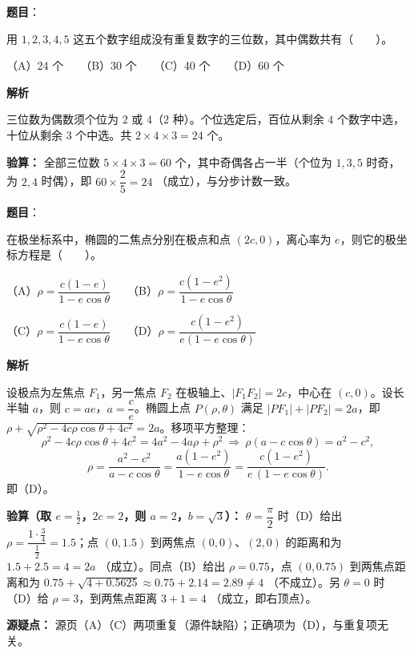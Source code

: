 \begin{answer}

\textbf{题目}：

用 $1,2,3,4,5$ 这五个数字组成没有重复数字的三位数，其中偶数共有\mbox{（　　）}。

（A）24 个　　（B）30 个　　（C）40 个　　（D）60 个

\textbf{解析}

三位数为偶数须个位为 $2$ 或 $4$（$2$ 种）。个位选定后，百位从剩余 $4$ 个数字中选，十位从剩余 $3$ 个中选。共 $2\times4\times3=24$ 个。

\textbf{验算：} 全部三位数 $5\times4\times3=60$ 个，其中奇偶各占一半（个位为 $1,3,5$ 时奇，为 $2,4$ 时偶），即 $60\times\dfrac25=24$ （成立），与分步计数一致。


\par\medskip

\end{answer}
\begin{answer}

\textbf{题目}：

在极坐标系中，椭圆的二焦点分别在极点和点 $(2c,0)$，离心率为 $e$，则它的极坐标方程是\mbox{（　　）}。

（A）$\rho=\dfrac{c(1-e)}{1-e\cos\theta}$　　（B）$\rho=\dfrac{c(1-e^2)}{1-e\cos\theta}$

（C）$\rho=\dfrac{c(1-e)}{1-e\cos\theta}$　　（D）$\rho=\dfrac{c(1-e^2)}{e(1-e\cos\theta)}$

\textbf{解析}

设极点为左焦点 $F_1$，另一焦点 $F_2$ 在极轴上、$|F_1F_2|=2c$，中心在 $(c,0)$。设长半轴 $a$，则 $c=ae$，$a=\dfrac{c}{e}$。椭圆上点 $P(\rho,\theta)$ 满足 $|PF_1|+|PF_2|=2a$，即 $\rho+\sqrt{\rho^2-4c\rho\cos\theta+4c^2}=2a$。移项平方整理：
\nopagebreak[4]
\[\rho^2-4c\rho\cos\theta+4c^2=4a^2-4a\rho+\rho^2\ \Longrightarrow\ \rho(a-c\cos\theta)=a^2-c^2,\]
\nopagebreak[4]
\[\rho=\frac{a^2-c^2}{a-c\cos\theta}=\frac{a(1-e^2)}{1-e\cos\theta}=\frac{c(1-e^2)}{e\,(1-e\cos\theta)}.\]
即（D）。

\textbf{验算（取 $e=\frac12$，$2c=2$，则 $a=2$，$b=\sqrt3$）：} $\theta=\dfrac{\pi}{2}$ 时（D）给出 $\rho=\dfrac{1\cdot\frac34}{\frac12}=1.5$；点 $(0,1.5)$ 到两焦点 $(0,0)$、$(2,0)$ 的距离和为 $1.5+2.5=4=2a$ （成立）。同点（B）给出 $\rho=0.75$，点 $(0,0.75)$ 到两焦点距离和为 $0.75+\sqrt{4+0.5625}\approx0.75+2.14=2.89\ne4$ （不成立）。另 $\theta=0$ 时（D）给 $\rho=3$，到两焦点距离 $3+1=4$ （成立，即右顶点）。

\textbf{源疑点：} 源页（A）（C）两项重复（源件缺陷）；正确项为（D），与重复项无关。


\par\medskip

\end{answer}
